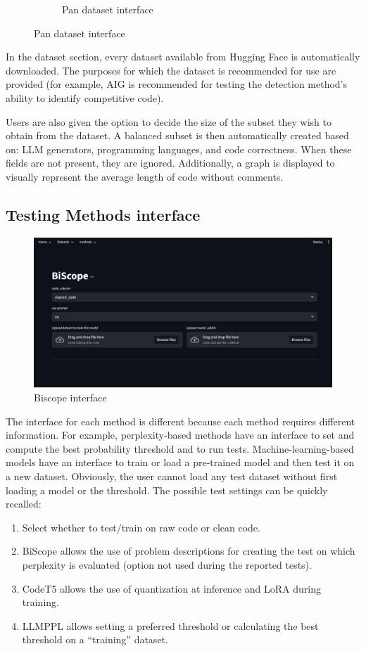 \begin{figure}[H]
\begin{subfigure}[t]{0.45\textwidth}
        \caption{Pan dataset interface}
        \label{fig:ab2sceyg}
    \end{subfigure}
\end{figure}

In the dataset section, every dataset available from Hugging 
Face is automatically downloaded. The purposes for which the 
dataset is recommended for use are provided (for example, AIG 
is recommended for testing the detection method's ability to 
identify competitive code).

Users are also given the option to decide the size of the 
subset they wish to obtain from the dataset. A balanced subset 
is then automatically created based on: LLM generators, 
programming languages, and code correctness. When these 
fields are not present, they are ignored. Additionally, a 
graph is displayed to visually represent the average length 
of code without comments.

\clearpage
\subsection{Testing Methods interface}
\begin{figure}[H]
        \centering
        \includegraphics[width=0.8\linewidth]{img/interfaccia/Screenshot 2025-09-27 172640.png}
        \caption{Biscope interface}
        \label{fig:errit}
\end{figure}

The interface for each method is different because each method requires 
different information. For example, perplexity-based methods have an interface 
to set and compute the best probability threshold and to run tests. 
Machine-learning-based models have an interface to train or load a 
pre-trained model and then test it on a new dataset. Obviously, 
the user cannot load any test dataset without first loading a model 
or the threshold.
The possible test settings can be quickly recalled:
\begin{enumerate}
\item Select whether to test/train on raw code or clean code.
\item BiScope allows the use of problem descriptions for creating the test on which perplexity is evaluated (option not used during the reported tests).
\item CodeT5 allows the use of quantization at inference and LoRA during training.
\item LLMPPL allows setting a preferred threshold or calculating the best threshold on a “training” dataset.
\end{enumerate}
